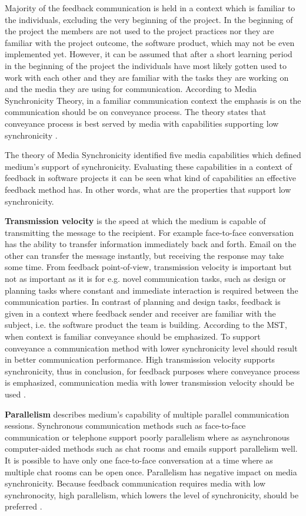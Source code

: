 \documentclass[english,12pt,a4paper,pdftex]{article}
\begin{document}
Majority of the feedback communication is held in a context which is familiar to the individuals, excluding the very beginning of the project. In the beginning of the project the members are not used to the project practices nor they are familiar with the project outcome, the software product, which may not be even implemented yet. However, it can be assumed that after a short learning period in the beginning of the project the individuals have most likely gotten used to work with each other and they are familiar with the tasks they are working on and the media they are using for communication. According to Media Synchronicity Theory, in a familiar communication context the emphasis is on the communication should be on conveyance process. The theory states that conveyance process is best served by media with capabilities supporting low synchronicity \citep{dennis1999} \citep{dennis2008}.

The theory of Media Synchronicity identified five media capabilities which defined medium's support of synchronicity. Evaluating these capabilities in a context of feedback in software projects it can be seen what kind of capabilities an effective feedback method has. In other words, what are the properties that support low synchronicity.

\textbf{Transmission velocity} is the speed at which the medium is capable of transmitting the message to the recipient. For example face-to-face conversation has the ability to transfer information immediately back and forth. Email on the other can transfer the message instantly, but receiving the response may take some time. From feedback point-of-view, transmission velocity is important but not as important as it is for e.g. novel communication tasks, such as design or planning tasks where constant and immediate interaction is required between the communication parties. In contrast of planning and design tasks, feedback is given in a context where feedback sender and receiver are familiar with the subject, i.e. the software product the team is building. According to the MST, when context is familiar conveyance should be emphasized. To support conveyance a communication method with lower synchronicity level should result in better communication performance. High transmission velocity supports synchronicity, thus in conclusion, for feedback purposes where conveyance process is emphasized, communication media with lower transmission velocity should be used \citep{dennis1999}.

\textbf{Parallelism} describes medium's capability of multiple parallel communication sessions. Synchronous communication methods such as face-to-face communication or telephone support poorly parallelism where as asynchronous computer-aided methods such as chat rooms and emails support parallelism well. It is possible to have only one face-to-face conversation at a time where as multiple chat rooms can be open once. Parallelism has negative impact on media synchronicity. Because feedback communication requires media with low synchronocity, high parallelism, which lowers the level of synchronicity, should be preferred \citep{dennis1999}.
\end{document}
